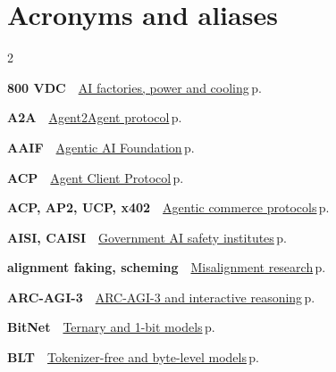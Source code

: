\documentclass[10pt,a4paper,openany]{report}
\begin{document}
\chapter{Acronyms and aliases}
\begin{multicols}{2}\small\raggedright
\textbf{\sffamily\color{accent}800 VDC}\ \ \hyperref[c:hardware-12]{AI factories, power and cooling}\,{\color{muted}\scriptsize p.\,\pageref{c:hardware-12}}\par\vspace{2pt}
\textbf{\sffamily\color{accent}A2A}\ \ \hyperref[c:protocols-3]{Agent2Agent protocol}\,{\color{muted}\scriptsize p.\,\pageref{c:protocols-3}}\par\vspace{2pt}
\textbf{\sffamily\color{accent}AAIF}\ \ \hyperref[c:protocols-4]{Agentic AI Foundation}\,{\color{muted}\scriptsize p.\,\pageref{c:protocols-4}}\par\vspace{2pt}
\textbf{\sffamily\color{accent}ACP}\ \ \hyperref[c:protocols-7]{Agent Client Protocol}\,{\color{muted}\scriptsize p.\,\pageref{c:protocols-7}}\par\vspace{2pt}
\textbf{\sffamily\color{accent}ACP, AP2, UCP, x402}\ \ \hyperref[c:protocols-9]{Agentic commerce protocols}\,{\color{muted}\scriptsize p.\,\pageref{c:protocols-9}}\par\vspace{2pt}
\textbf{\sffamily\color{accent}AISI, CAISI}\ \ \hyperref[c:safety-13]{Government AI safety institutes}\,{\color{muted}\scriptsize p.\,\pageref{c:safety-13}}\par\vspace{2pt}
\textbf{\sffamily\color{accent}alignment faking, scheming}\ \ \hyperref[c:safety-9]{Misalignment research}\,{\color{muted}\scriptsize p.\,\pageref{c:safety-9}}\par\vspace{2pt}
\textbf{\sffamily\color{accent}ARC-AGI-3}\ \ \hyperref[c:evals-4]{ARC-AGI-3 and interactive reasoning}\,{\color{muted}\scriptsize p.\,\pageref{c:evals-4}}\par\vspace{2pt}
\textbf{\sffamily\color{accent}BitNet}\ \ \hyperref[c:quant-6]{Ternary and 1-bit models}\,{\color{muted}\scriptsize p.\,\pageref{c:quant-6}}\par\vspace{2pt}
\textbf{\sffamily\color{accent}BLT}\ \ \hyperref[c:arch-9]{Tokenizer-free and byte-level models}\,{\color{muted}\scriptsize p.\,\pageref{c:arch-9}}\par\vspace{2pt}

\end{multicols}
\end{document}
